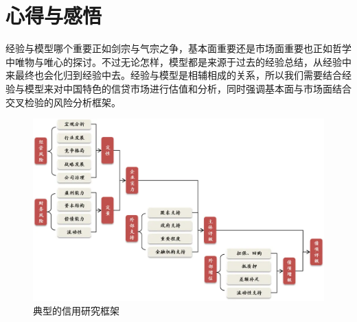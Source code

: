 \documentclass[a4paper,12pt]{ctexart}
\begin{document}
\section{心得与感悟}
经验与模型哪个重要正如剑宗与气宗之争，基本面重要还是市场面重要也正如哲学中唯物与唯心的探讨。不过无论怎样，模型都是来源于过去的经验总结，从经验中来最终也会化归到经验中去。经验与模型是相辅相成的关系，所以我们需要结合经验与模型来对中国特色的信贷市场进行估值和分析，同时强调基本面与市场面结合交叉检验的风险分析框架。
\begin{figure}[H]
    \includegraphics[width=\linewidth]{fig/信用研究框架.png}
    \caption{典型的信用研究框架}
\end{figure}
\end{document}
